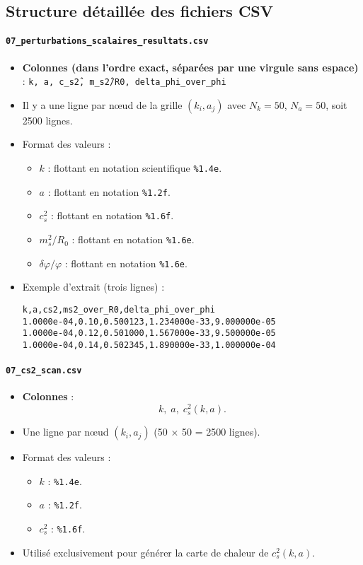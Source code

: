 \subsection{Structure détaillée des fichiers CSV}

\paragraph{\texttt{07\_perturbations\_scalaires\_resultats.csv}}
\begin{itemize}
  \item \textbf{Colonnes (dans l’ordre exact, séparées par une virgule sans espace)} :
  \texttt{k, a, c\_s\^2, m\_s\^2/R0, delta\_phi\_over\_phi}
  \item Il y a une ligne par nœud de la grille \((k_{i},a_{j})\) avec \(N_{k}=50\), \(N_{a}=50\), soit 2500 lignes.
  \item Format des valeurs :
  \begin{itemize}
    \item \(k\) : flottant en notation scientifique \texttt{\%1.4e}.
    \item \(a\) : flottant en notation \texttt{\%1.2f}.
    \item \(c_{s}^{2}\) : flottant en notation \texttt{\%1.6f}.
    \item \(m_{s}^{2}/R_{0}\) : flottant en notation \texttt{\%1.6e}.
    \item \(\delta\varphi/\varphi\) : flottant en notation \texttt{\%1.6e}.
  \end{itemize}
  \item Exemple d’extrait (trois lignes) :
    \begin{verbatim}
k,a,cs2,ms2_over_R0,delta_phi_over_phi
1.0000e-04,0.10,0.500123,1.234000e-33,9.000000e-05
1.0000e-04,0.12,0.501000,1.567000e-33,9.500000e-05
1.0000e-04,0.14,0.502345,1.890000e-33,1.000000e-04
    \end{verbatim}
\end{itemize}

\paragraph{\texttt{07\_cs2\_scan.csv}}
\begin{itemize}
  \item \textbf{Colonnes} :
    \[
      k,\;a,\;c_{s}^{2}(k,a).
    \]
  \item Une ligne par nœud \((k_{i},a_{j})\) (50 × 50 = 2500 lignes).
  \item Format des valeurs :
  \begin{itemize}
    \item \(k\) : \texttt{\%1.4e}.
    \item \(a\) : \texttt{\%1.2f}.
    \item \(c_{s}^{2}\) : \texttt{\%1.6f}.
  \end{itemize}
  \item Utilisé exclusivement pour générer la carte de chaleur de \(c_{s}^{2}(k,a)\).
\end{itemize}

